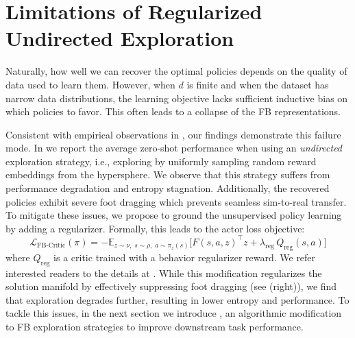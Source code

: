 \section{Limitations of Regularized Undirected Exploration }
\label{sec:limitations}
Naturally, how well we can recover the optimal policies depends on the quality of data used to learn them.  However, when $d$ is finite and when the dataset has narrow data distributions, the learning objective lacks sufficient inductive bias on which policies to favor. This often leads to a collapse of the FB representations.

 Consistent with empirical observations in \citep{tirinzoni2025zeroshot}, our findings demonstrate this failure mode. In  we report the average zero-shot performance when using an \textit{undirected} exploration strategy, i.e., exploring by uniformly sampling random reward embeddings from the hypersphere. We observe that this strategy suffers from performance degradation and entropy stagnation. Additionally, the recovered policies exhibit severe foot dragging which prevents seamless sim-to-real transfer. To mitigate these issues, we propose to ground the unsupervised policy learning by adding a regularizer. Formally, this leads to the actor loss objective:
\begin{equation}
\mathcal{L}_{\text{FB-Critic}}(\pi)
=
-\mathbb{E}_{z\sim\nu,\; s\sim\rho,\; a\sim\pi_z(s)}\Big[
F(s,a,z)^\top z
+
\lambda_{\text{reg}}\,
Q_{\text{reg}}(s,a)
\Big]
\label{eq:actor_loss_with_reg}
\end{equation}
where $Q_\text{reg}$ is a critic trained with a behavior regularizer reward. We refer interested readers to the details at . While this modification regularizes the solution manifold by effectively suppressing foot dragging (see  (right)), we find that exploration degrades further, resulting in lower entropy and performance.
To tackle this issues, in the next section we introduce \method, an algorithmic modification to FB exploration strategies to improve downstream task performance.


